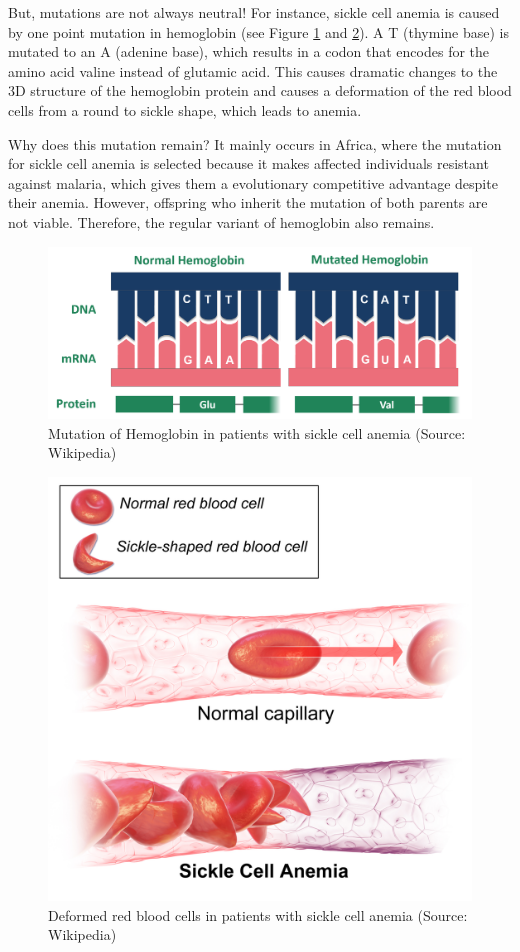 \documentclass[
  11pt,
]{book}
\begin{document}
But, mutations are not always neutral! For instance, sickle cell anemia is caused by one point mutation in hemoglobin (see Figure \ref{fig:sickleCell1} and \ref{fig:sickleCell2}). A T (thymine base) is mutated to an A (adenine base), which results in a codon that encodes for the amino acid valine instead of glutamic acid. This causes dramatic changes to the 3D structure of the hemoglobin protein and causes a deformation of the red blood cells from a round to sickle shape, which leads to anemia.

Why does this mutation remain? It mainly occurs in Africa, where the mutation for sickle cell anemia is selected because it makes affected individuals resistant against malaria, which gives them a evolutionary competitive advantage despite their anemia. However, offspring who inherit the mutation of both parents are not viable. Therefore, the regular variant of hemoglobin also remains.

\begin{figure}

{\centering \includegraphics[width=0.45\linewidth]{./figs/sickleCellWikipedia2} 

}

\caption{Mutation of Hemoglobin in patients with sickle cell anemia (Source: Wikipedia)}\label{fig:sickleCell1}
\end{figure}

\begin{figure}

{\centering \includegraphics[width=0.45\linewidth]{./figs/Sickle_Cell_Anemia_wiki3} 

}

\caption{Deformed red blood cells in patients with sickle cell anemia (Source: Wikipedia)}\label{fig:sickleCell2}
\end{figure}
\end{document}
